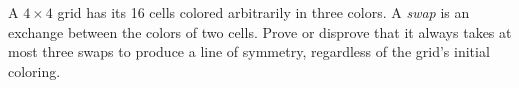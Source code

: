 A $4\times4$ grid has its 16 cells colored arbitrarily in three colors. A \textit{swap} is an exchange between the colors of two cells. Prove or disprove that it always takes at most three swaps to produce a line of symmetry, regardless of the grid's initial coloring.

